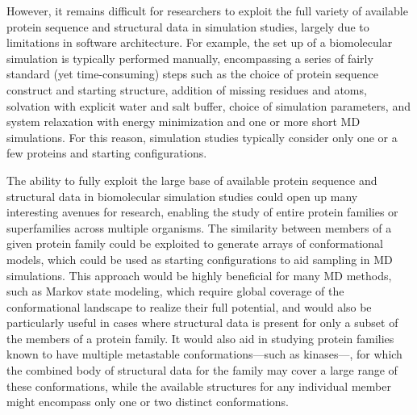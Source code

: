 \documentclass[aps,pre,twocolumn,nofootinbib,superscriptaddress,linenumbers]{revtex4-1}
\begin{document}
However, it remains difficult for researchers to exploit the full variety of available protein sequence and structural data in simulation studies, largely due to limitations in software architecture.
For example, the set up of a biomolecular simulation is typically performed manually, encompassing a series of fairly standard (yet time-consuming) steps such as the choice of protein sequence construct and starting structure, addition of missing residues and atoms, solvation with explicit water and salt buffer, choice of simulation parameters, and system relaxation with energy minimization and one or more short MD simulations.
For this reason, simulation studies typically consider only one or a few proteins and starting configurations.

The ability to fully exploit the large base of available protein sequence and structural data in biomolecular simulation studies could open up many interesting avenues for research, enabling the study of entire protein families or superfamilies across multiple organisms.
The similarity between members of a given protein family could be exploited to generate arrays of conformational models, which could be used as starting configurations to aid sampling in MD simulations.
This approach would be highly beneficial for many MD methods, such as Markov state modeling, which require global coverage of the conformational landscape to realize their full potential, and would also be particularly useful in cases where structural data is present for only a subset of the members of a protein family.
It would also aid in studying protein families known to have multiple metastable conformations---such as kinases---, for which the combined body of structural data for the family may cover a large range of these conformations, while the available structures for any individual member might encompass only one or two distinct conformations.
\end{document}
